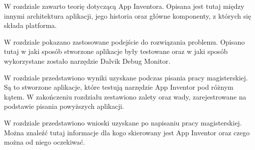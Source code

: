 W rozdziale  zawarto teorię dotyczącą App Inventora. Opisana jest tutaj między innymi architektura aplikacji, jego historia oraz główne komponenty, z których się składa platforma.

W rozdziale  pokazano zastosowane podejście do rozwiązania problemu. Opisano tutaj w jaki sposób stworzone aplikacje były testowane oraz w jaki sposób wykorzystane zostało narzędzie Dalvik Debug Monitor.

W rozdziale  przedstawiono wyniki uzyskane podczas pisania pracy magisterskiej. Są to stworzone aplikacje, które testują narzędzie App Inventor pod różnym kątem. W zakończeniu rozdziału zestawiono zalety oraz wady, zarejestrowane na podstawie pisania powyższych aplikacji.

W rozdziale  przedstawiono wnioski uzyskane po napisaniu pracy magisterskiej. Można znaleźć tutaj informacje dla kogo skierowany jest App Inventor oraz czego można od niego oczekiwać.











